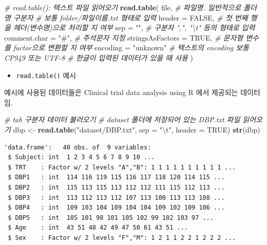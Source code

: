 \documentclass[
  11pt,
]{krantz}
\newenvironment{Shaded}{\begin{snugshade}}{\end{snugshade}}
\newcommand{\CharTok}[1]{\textcolor[rgb]{0.5,0.5,0.5}{#1}}
\newcommand{\CommentTok}[1]{\textcolor[rgb]{0.37,0.37,0.37}{\textit{#1}}}
\newcommand{\DataTypeTok}[1]{\textcolor[rgb]{0.27,0.27,0.27}{#1}}
\newcommand{\KeywordTok}[1]{\textcolor[rgb]{0.27,0.27,0.27}{\textbf{#1}}}
\newcommand{\NormalTok}[1]{#1}
\newcommand{\OtherTok}[1]{\textcolor[rgb]{0.37,0.37,0.37}{#1}}
\newcommand{\StringTok}[1]{\textcolor[rgb]{0.5,0.5,0.5}{#1}}
\providecommand{\tightlist}{%
  \setlength{\itemsep}{0pt}\setlength{\parskip}{0pt}}
\let\BeginKnitrBlock\begin \let\EndKnitrBlock\end
\begin{document}
\begin{Shaded}
\begin{Highlighting}[]
\CommentTok{# read.table(): 텍스트 파일 읽어오기}
\KeywordTok{read.table}\NormalTok{(}
\NormalTok{  file, }\CommentTok{# 파일명. 일반적으로 폴더명 구분자 }
        \CommentTok{# 보통 folder/파일이름.txt 형태로 입력}
  \DataTypeTok{header =} \OtherTok{FALSE}\NormalTok{, }\CommentTok{# 첫 번째 행을 헤더(변수명)으로 처리할 지 여부}
  \DataTypeTok{sep =} \StringTok{""}\NormalTok{, }\CommentTok{# 구분자 ",", "\textbackslash{}t" 등의 형태로 입력}
  \DataTypeTok{comment.char =} \StringTok{"#"}\NormalTok{, }\CommentTok{# 주석문자 지정}
  \DataTypeTok{stringsAsFactors =} \OtherTok{TRUE}\NormalTok{, }\CommentTok{# 문자형 변수를 factor으로 변환할 지 여부}
  \DataTypeTok{encoding =} \StringTok{"unknown"} \CommentTok{# 텍스트의 encoding 보통 CP949 또는 UTF-8}
                       \CommentTok{# 한글이 입력된 데이터가 있을 때 사용}
\NormalTok{)}
\end{Highlighting}
\end{Shaded}

\normalsize

\begin{itemize}
\tightlist
\item
  \texttt{read.table()} 예시
\end{itemize}

\footnotesize

\BeginKnitrBlock{rmdnote}
예시에 사용된 데이터들은 Clinical trial data analysis using R \citep{chen-2010}에서 제공되는 데이터임.
\EndKnitrBlock{rmdnote}

\normalsize

\footnotesize

\begin{Shaded}
\begin{Highlighting}[]
\CommentTok{# tab 구분자 데이터 불러오기}
\CommentTok{# dataset 폴더에 저장되어 있는 DBP.txt 파일 읽어오기}
\NormalTok{dbp <-}\StringTok{ }\KeywordTok{read.table}\NormalTok{(}\StringTok{"dataset/DBP.txt"}\NormalTok{, }\DataTypeTok{sep =} \StringTok{"}\CharTok{\textbackslash{}t}\StringTok{"}\NormalTok{, }\DataTypeTok{header =} \OtherTok{TRUE}\NormalTok{)}
\KeywordTok{str}\NormalTok{(dbp)}
\end{Highlighting}
\end{Shaded}

\begin{verbatim}
'data.frame':   40 obs. of  9 variables:
 $ Subject: int  1 2 3 4 5 6 7 8 9 10 ...
 $ TRT    : Factor w/ 2 levels "A","B": 1 1 1 1 1 1 1 1 1 1 ...
 $ DBP1   : int  114 116 119 115 116 117 118 120 114 115 ...
 $ DBP2   : int  115 113 115 113 112 112 111 115 112 113 ...
 $ DBP3   : int  113 112 113 112 107 113 100 113 113 108 ...
 $ DBP4   : int  109 103 104 109 104 104 109 102 109 106 ...
 $ DBP5   : int  105 101 98 101 105 102 99 102 103 97 ...
 $ Age    : int  43 51 48 42 49 47 50 61 43 51 ...
 $ Sex    : Factor w/ 2 levels "F","M": 1 2 1 1 2 2 1 2 2 2 ...
\end{verbatim}
\end{document}
